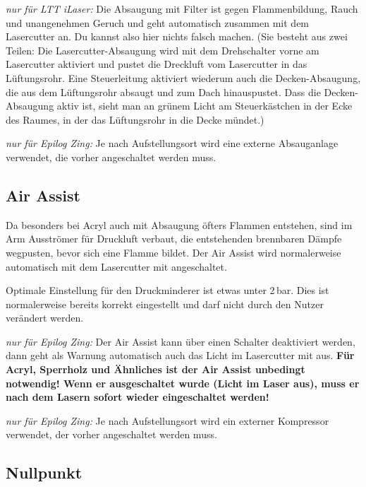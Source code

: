 \documentclass{\basedir/fablab-document}
\newcommand{\knopf}[2]{
	\begin{tikzpicture}[baseline={(box.base)}]
	\node [#1] (box) {
		\fontsize{9pt}{9pt}\selectfont \textbf{#2}\strut
	};
	\end{tikzpicture}
}
\newcommand{\nurZing}{\emph{nur für Epilog Zing:} }
\newcommand{\nurLTT}{\emph{nur für LTT iLaser:} }
\newcommand{\lueftungKnopf}[1]{\knopf{lueftungsknopf}{#1}}
\newcommand{\reflectboxX}[1]{\raisebox{\depth}{\scalebox{1}[-1]{#1}}} %
\newcommand{\returnSymbol}{\reflectboxX{\ensuremath{\mathbf{\Lsh}}}} %
\newcommand{\lueftungEnter}{\lueftungKnopf{\returnSymbol}}
\newcommand{\lueftungMinus}{\lueftungKnopf{-}}
\newcommand{\lueftungPlus}{\lueftungKnopf{+}}
\newcommand{\lueftungOn}{\lueftungKnopf{On}}
\newcommand{\lueftungOff}{\lueftungKnopf{Off}}
\begin{document}
	\nurLTT Die Absaugung mit Filter ist gegen Flammenbildung, Rauch und unangenehmen Geruch und geht automatisch zusammen mit dem Lasercutter an. Du kannst also hier nichts falsch machen. (Sie besteht aus zwei Teilen: Die Lasercutter-Absaugung wird mit dem Drehschalter vorne am Lasercutter aktiviert und pustet die Dreckluft vom Lasercutter in das Lüftungsrohr. Eine Steuerleitung aktiviert wiederum auch die Decken-Absaugung, die aus dem Lüftungsrohr absaugt und zum Dach hinauspustet. Dass die Decken-Absaugung aktiv ist, sieht man an grünem Licht am Steuerkästchen in der Ecke des Raumes, in der das Lüftungsrohr in die Decke mündet.)

	\nurZing Je nach Aufstellungsort wird eine externe Absauganlage verwendet, die vorher angeschaltet werden muss.


	\subsection{Air Assist}
	\label{sec:air-assist}
	Da besonders bei Acryl auch mit Absaugung öfters Flammen entstehen, sind im Arm Ausströmer für Druckluft verbaut, die entstehenden brennbaren Dämpfe wegpusten, bevor sich eine Flamme bildet. Der Air Assist wird normalerweise automatisch mit dem Lasercutter mit angeschaltet.

	Optimale Einstellung für den Druckminderer ist etwas unter 2\,bar. Dies ist normalerweise bereits korrekt eingestellt und darf nicht durch den Nutzer verändert werden.

	\nurZing Der Air Assist kann über einen Schalter deaktiviert werden, dann geht als Warnung automatisch auch das Licht im Lasercutter mit aus. \textbf{Für Acryl, Sperrholz und Ähnliches ist der Air Assist unbedingt notwendig! Wenn er ausgeschaltet wurde (Licht im Laser aus), muss er nach dem Lasern sofort wieder eingeschaltet werden!}

	\nurZing Je nach Aufstellungsort wird ein externer Kompressor verwendet, der vorher angeschaltet werden muss.

	\subsection{Nullpunkt} \label{nullpunkt}
\end{document}
